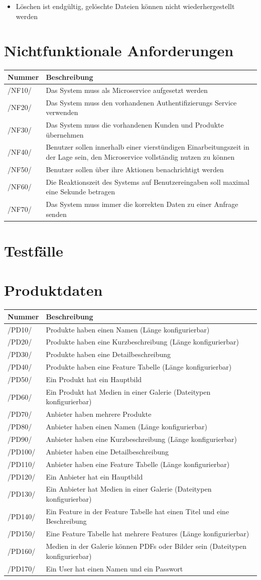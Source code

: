 \documentclass[a4paper,12pt]{article}
\newcommand\addrow[2]{#1 &#2\\ }
\newcommand\addheading[2]{#1 &#2\\ \hline}
\newcommand\tabularhead{\begin{tabular}{lp{13cm}}
\hline
}
\newenvironment{usecase}{\tabularhead}
{\hline\end{tabular}}
\begin{document}
\begin{itemize}

\item
  Löschen ist endgültig, gelöschte Dateien können nicht
  wiederhergestellt werden
\end{itemize}

\section{Nichtfunktionale Anforderungen}
\begin{usecase}
  \addheading{Nummer}{Beschreibung} 
  \addrow{/NF10/}{Das System muss als Microservice aufgesetzt werden}  
  \addrow{/NF20/}{Das System muss den vorhandenen Authentifizierungs Service verwenden}
  \addrow{/NF30/}{Das System muss die vorhandenen Kunden und Produkte übernehmen}
  \addrow{/NF40/}{Benutzer sollen innerhalb einer vierstündigen Einarbeitungszeit in der Lage sein, den Microservice vollständig nutzen zu können}
  \addrow{/NF50/}{Benutzer sollen über ihre Aktionen benachrichtigt werden}
  \addrow{/NF60/}{Die Reaktionszeit des Systems auf Benutzereingaben soll maximal eine Sekunde betragen}
  \addrow{/NF70/}{Das System muss immer die korrekten Daten zu einer Anfrage senden}
\end{usecase}

\clearpage

\section{Testfälle}

\section{Produktdaten}
\begin{usecase}
  \addheading{Nummer}{Beschreibung} 
  \addrow{/PD10/}{Produkte haben einen Namen (Länge konfigurierbar)}
  \addrow{/PD20/}{Produkte haben eine Kurzbeschreibung (Länge konfigurierbar)}
  \addrow{/PD30/}{Produkte haben eine Detailbeschreibung}
  \addrow{/PD40/}{Produkte haben eine Feature Tabelle (Länge konfigurierbar)}
  \addrow{/PD50/}{Ein Produkt hat ein Hauptbild}
  \addrow{/PD60/}{Ein Produkt hat Medien in einer Galerie (Dateitypen konfigurierbar)}
  \addrow{/PD70/}{Anbieter haben mehrere Produkte}
  \addrow{/PD80/}{Anbieter haben einen Namen (Länge konfigurierbar)}
  \addrow{/PD90/}{Anbieter haben eine Kurzbeschreibung (Länge konfigurierbar)}
  \addrow{/PD100/}{Anbieter haben eine Detailbeschreibung}
  \addrow{/PD110/}{Anbieter haben eine Feature Tabelle (Länge konfigurierbar)}
  \addrow{/PD120/}{Ein Anbieter hat ein Hauptbild}
  \addrow{/PD130/}{Ein Anbieter hat Medien in einer Galerie (Dateitypen konfigurierbar)}
  \addrow{/PD140/}{Ein Feature in der Feature Tabelle hat einen Titel und eine Beschreibung}
  \addrow{/PD150/}{Eine Feature Tabelle hat mehrere Features (Länge konfigurierbar)}
  \addrow{/PD160/}{Medien in der Galerie können PDFs oder Bilder sein (Dateitypen konfigurierbar)}
  \addrow{/PD170/}{Ein User hat einen Namen und ein Passwort}
\end{usecase}
\end{document}
